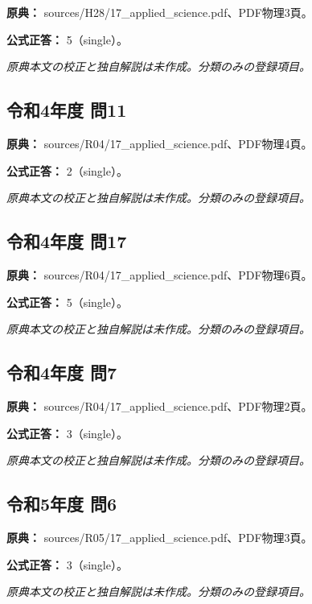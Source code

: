 \noindent\textbf{原典：} sources/H28/17\_applied\_science.pdf、PDF物理3頁。

\textbf{公式正答：} 5（single）。

\par\textit{原典本文の校正と独自解説は未作成。分類のみの登録項目。}

\subsection{令和4年度 問11}
\label{q:r04-reg-applied-11}

\noindent\textbf{原典：} sources/R04/17\_applied\_science.pdf、PDF物理4頁。

\textbf{公式正答：} 2（single）。

\par\textit{原典本文の校正と独自解説は未作成。分類のみの登録項目。}

\subsection{令和4年度 問17}
\label{q:r04-reg-applied-17}

\noindent\textbf{原典：} sources/R04/17\_applied\_science.pdf、PDF物理6頁。

\textbf{公式正答：} 5（single）。

\par\textit{原典本文の校正と独自解説は未作成。分類のみの登録項目。}

\subsection{令和4年度 問7}
\label{q:r04-reg-applied-07}

\noindent\textbf{原典：} sources/R04/17\_applied\_science.pdf、PDF物理2頁。

\textbf{公式正答：} 3（single）。

\par\textit{原典本文の校正と独自解説は未作成。分類のみの登録項目。}

\subsection{令和5年度 問6}
\label{q:r05-reg-applied-06}

\noindent\textbf{原典：} sources/R05/17\_applied\_science.pdf、PDF物理3頁。

\textbf{公式正答：} 3（single）。

\par\textit{原典本文の校正と独自解説は未作成。分類のみの登録項目。}
